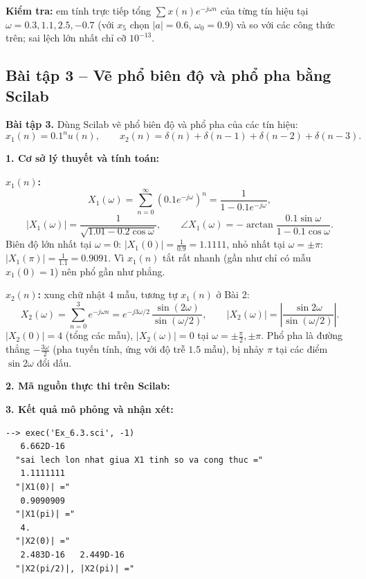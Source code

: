 \documentclass[12pt,a4paper]{article}
\begin{document}
\textbf{Kiểm tra:} em tính trực tiếp tổng $\sum x(n) e^{-j\omega n}$ của từng tín hiệu tại $\omega = 0.3, 1.1, 2.5, -0.7$ (với $x_5$ chọn $|a| = 0.6$, $\omega_0 = 0.9$) và so với các công thức trên; sai lệch lớn nhất chỉ cỡ $10^{-13}$.

\subsection{Bài tập 3 -- Vẽ phổ biên độ và phổ pha bằng Scilab}
\begin{mdframed}[style=exbox]
\noindent\textbf{Bài tập 3.} Dùng Scilab vẽ phổ biên độ và phổ pha của các tín hiệu:
\[
    x_1(n) = 0.1^n u(n), \qquad x_2(n) = \delta(n) + \delta(n-1) + \delta(n-2) + \delta(n-3).
\]
\end{mdframed}

\noindent\textbf{1. Cơ sở lý thuyết và tính toán:}

\textbf{$x_1(n)$:}
\[
    X_1(\omega) = \sum_{n=0}^{\infty} \left(0.1e^{-j\omega}\right)^n = \frac{1}{1 - 0.1e^{-j\omega}},
\]
\[
    |X_1(\omega)| = \frac{1}{\sqrt{1.01 - 0.2\cos\omega}},
    \qquad
    \angle X_1(\omega) = -\arctan\frac{0.1\sin\omega}{1 - 0.1\cos\omega}.
\]
Biên độ lớn nhất tại $\omega = 0$: $|X_1(0)| = \frac{1}{0.9} = 1.1111$, nhỏ nhất tại $\omega = \pm\pi$: $|X_1(\pi)| = \frac{1}{1.1} = 0.9091$. Vì $x_1(n)$ tắt rất nhanh (gần như chỉ có mẫu $x_1(0) = 1$) nên phổ gần như phẳng.

\textbf{$x_2(n)$:} xung chữ nhật 4 mẫu, tương tự $x_1(n)$ ở Bài 2:
\[
    X_2(\omega) = \sum_{n=0}^{3} e^{-j\omega n} = e^{-j3\omega/2}\, \frac{\sin(2\omega)}{\sin(\omega/2)},
    \qquad
    |X_2(\omega)| = \left|\frac{\sin 2\omega}{\sin(\omega/2)}\right|.
\]
$|X_2(0)| = 4$ (tổng các mẫu), $|X_2(\omega)| = 0$ tại $\omega = \pm\frac{\pi}{2}, \pm\pi$. Phổ pha là đường thẳng $-\frac{3\omega}{2}$ (pha tuyến tính, ứng với độ trễ $1.5$ mẫu), bị nhảy $\pi$ tại các điểm $\sin 2\omega$ đổi dấu.

\noindent\textbf{2. Mã nguồn thực thi trên Scilab:}


\noindent\textbf{3. Kết quả mô phỏng và nhận xét:}
\begin{lstlisting}[style=consolestyle]
--> exec('Ex_6.3.sci', -1)
   6.662D-16
  "sai lech lon nhat giua X1 tinh so va cong thuc ="
   1.1111111
  "|X1(0)| ="
   0.9090909
  "|X1(pi)| ="
   4.
  "|X2(0)| ="
   2.483D-16   2.449D-16
  "|X2(pi/2)|, |X2(pi)| ="
\end{lstlisting}
\end{document}
